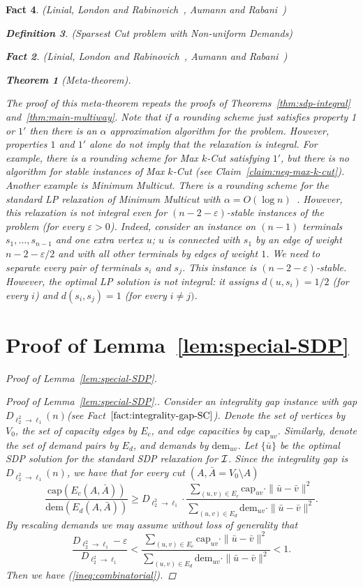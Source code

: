 \documentclass[twoside,leqno,twocolumn]{article}
\newtheorem{theorem}{Theorem}[section]
\newtheorem{Definition}[theorem]{Definition}
\newtheorem{fact}[theorem]{Fact}
\begin{document}
\begin{fact}{\sc (Linial, London and Rabinovich~\cite{LLR}, Aumann and Rabani~\cite{AR})}
\begin{Definition} {\sc (Sparsest Cut problem with Non-uniform Demands)}
\begin{fact}{\sc (Linial, London and Rabinovich~\cite{LLR}, Aumann and Rabani~\cite{AR})}
\begin{theorem}[Meta-theorem]
\end{theorem}
The proof of this meta-theorem repeats the proofs of Theorems~\ref{thm:sdp-integral} and~\ref{thm:main-multiway}.
Note that if a rounding scheme just satisfies property 1 or $1'$ then there is an $\alpha$ approximation algorithm for the problem. However, properties $1$ and $1'$
alone do not imply that the relaxation is integral. For example, there is a rounding scheme for Max $k$-Cut  
satisfying $1'$, 
but there is no algorithm for stable instances of Max $k$-Cut (see Claim~\ref{claim:neg-max-k-cut}). 
Another example is Minimum Multicut. There is a rounding scheme for the standard LP relaxation of 
Minimum Multicut with $\alpha = O(\log n)$~\cite{LR}. However, this relaxation is not integral even for 
$(n - 2 -\varepsilon)$-stable instances of the problem (for every $\varepsilon> 0$). Indeed, consider an instance on $(n-1)$ terminals $s_1,\dots,
s_{n-1}$ and one extra vertex $u$; $u$ is connected with $s_1$ by an edge of weight $n-2-\varepsilon/2$ and with all other terminals by
edges of weight $1$. We need to separate every pair of terminals $s_i$ and $s_j$.
This instance is $(n-2-\varepsilon)$-stable. However, the optimal LP solution
is not integral: it assigns $d(u,s_i) = 1/2$ (for every $i$) and $d(s_i,s_j) = 1$ (for every $i\neq j)$. 


\appendix

\section{Proof of Lemma~\ref{lem:special-SDP}}\label{sec:proof-special-SDP}
\ifSODA
\noindent \textit{Proof of Lemma~\ref{lem:special-SDP}.}
\else
\begin{proof}[Proof of Lemma~\ref{lem:special-SDP}.]
\fi
Consider an integrality gap instance with gap $D_{\ell_2^2\to\ell_1}(n)$(see Fact~$\ref{fact:integrality-gap-SC}$).
Denote the set of vertices by $V_0$, the set of capacity edges by $E_c$, and edge capacities by $\mathrm{cap}_{uv}$.
Similarly, denote the set of demand pairs by $E_d$, and demands by $\mathrm{dem}_{uv}$. Let $\{\bar u\}$ be the optimal SDP solution 
for the standard SDP relaxation for $\cal I$. Since the integrality gap is $D_{\ell_2^2\to \ell_1}(n)$, we have
that for every cut $(A, \bar A=V_0\setminus A)$
$$
\frac{\mathrm{cap}(E_c(A,\bar A))}{\mathrm{dem}(E_d(A,\bar A))} \geq D_{\ell_2^2\to \ell_1}\cdot
\frac{\sum_{(u,v)\in E_c} \mathrm{cap}_{uv}\cdot\|\bar u - \bar v\|^2}{\sum_{(u,v)\in E_d} \mathrm{dem}_{uv}\cdot\|\bar u - \bar v\|^2}.
$$
By rescaling demands we may assume without loss of generality that 
$$\frac{D_{\ell_2^2\to \ell_1}-\varepsilon}{D_{\ell_2^2\to \ell_1}} <
\frac{\sum_{(u,v)\in E_c} \mathrm{cap}_{uv}\cdot \|\bar u - \bar v\|^2}{\sum_{(u,v)\in E_d} \mathrm{dem}_{uv}\cdot \|\bar u - \bar v\|^2} < 1.$$
Then we have (\ref{ineq:combinatorial}).


\end{proof}
\end{fact}
\end{Definition}
\end{fact}
\end{document}
